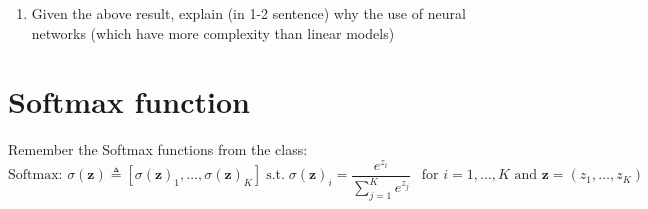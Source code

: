 \begin{enumerate}
{\[\begin{bmatrix}
                1
            \end{bmatrix}
            <
            \begin{bmatrix}
                0 \\
                3
            \end{bmatrix}
        \]
        which is the desired response at the same time for bad and not bad we get these outputs
        \[
            \text{ReLU} 
            \begin{bmatrix}
                1 \\
                -2  
            \end{bmatrix}
            +
            \begin{bmatrix}
                3 \\
                -2
            \end{bmatrix}
            =
            \begin{bmatrix}
                4 \\
                0
            \end{bmatrix}
            >
            \begin{bmatrix}
                3 \\
                0
            \end{bmatrix}
        \]
    }
    \item Given the above result, explain (in 1-2 sentence) why the use of neural networks (which have more complexity than linear models)
    \\
\end{enumerate}



\section{Softmax function}
\label{sec:softmax}
Remember  the Softmax functions from the class: 
$$
    \text{Softmax: } \sigma(\mathbf{z}) \triangleq [\sigma(\mathbf{z})_1, \hdots, \sigma(\mathbf{z})_K] \; \text{s.t.} \;  \sigma(\mathbf{z})_i = \frac{e^{z_i}}{\sum_{j=1}^K e^{z_j}} \ \ \text{ for } i = 1, \dotsc, K \text{ and } \mathbf{z} = (z_1, \dotsc, z_K)
$$


